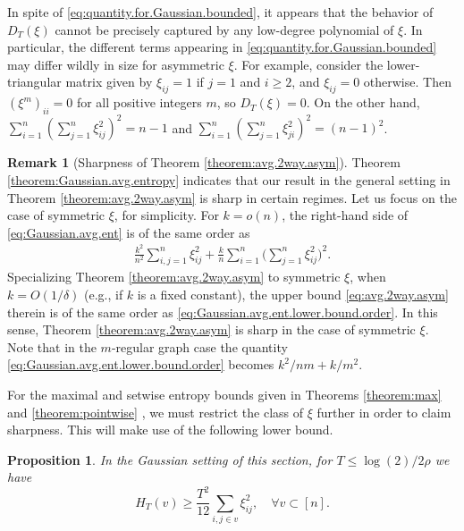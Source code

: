 \documentclass[11pt,reqno]{amsart}
\numberwithin{equation}{section}
\newtheorem{proposition}[theorem]{Proposition}
\theoremstyle{definition}
\newtheorem{remark}[theorem]{Remark}
\begin{document}
In spite of \eqref{eq:quantity.for.Gaussian.bounded}, it appears that the behavior of $D_T(\xi)$ cannot be precisely captured by any low-degree polynomial of $\xi$. In particular, the different terms appearing in \eqref{eq:quantity.for.Gaussian.bounded} may differ wildly in size for asymmetric $\xi$. For example, consider the lower-triangular matrix given by $\xi_{ij}=1$ if $j=1$ and $i \ge 2$, and $\xi_{ij}=0$ otherwise. Then $(\xi^m)_{ii}=0$ for all positive integers $m$, so $D_T(\xi)=0$. On the other hand, $\sum_{i=1}^n (\sum_{j=1}^n \xi_{ij}^2 )^2 = n-1$ and $\sum_{i=1}^n (\sum_{j=1}^n \xi_{ji}^2 )^2= (n-1)^2$.
 
	





\begin{remark}[Sharpness of Theorem \ref{theorem:avg.2way.asym}] \label{re:sharpness-avg}
Theorem \ref{theorem:Gaussian.avg.entropy} indicates that our result in the general setting in Theorem \ref{theorem:avg.2way.asym} is sharp in certain regimes. Let us focus on the case of symmetric $\xi$, for simplicity. For $k = o(n)$, the right-hand side of \eqref{eq:Gaussian.avg.ent} is  of the same order as
	\begin{align} \label{eq:Gaussian.avg.ent.lower.bound.order}
		\frac{k^2}{n^2} \sum_{i,j=1}^n \xi_{ij}^2 + \frac{k}{n} \sum_{i=1}^n \bigg(\sum_{j=1}^n \xi_{ij}^2\bigg)^2.
	\end{align}
Specializing Theorem \ref{theorem:avg.2way.asym}  to symmetric $\xi$, when $k= O(1/\delta)$ (e.g., if $k$ is a fixed constant),  the upper bound  \eqref{eq:avg.2way.asym} therein is  of the same order as \eqref{eq:Gaussian.avg.ent.lower.bound.order}. In this sense, Theorem \ref{theorem:avg.2way.asym} is sharp in the case of symmetric $\xi$. Note that in the $m$-regular graph case the quantity \eqref{eq:Gaussian.avg.ent.lower.bound.order} becomes $k^2/nm + k/m^2$.
\end{remark}


For the maximal and setwise entropy bounds given in Theorems \ref{theorem:max} and \ref{theorem:pointwise} , we must restrict the class of $\xi$ further in order to claim sharpness. This will make use of the following lower bound.

\begin{proposition} \label{pr:Gaussiancase-clique}
In the Gaussian setting of this section, for $T \le \log(2)/2\rho$ we have
\begin{equation}
H_T(v) \ge \frac{T^2}{12}\sum_{i,j \in v}\xi_{ij}^2, \quad \forall v \subset [n]. \label{pr:GaussianLB-pointwise}
\end{equation}
\end{proposition}
\end{document}
